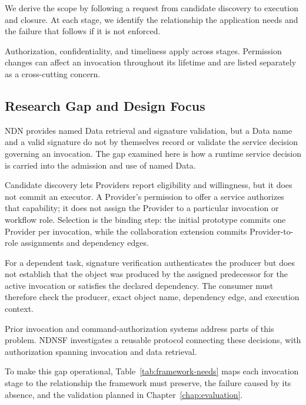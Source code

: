 We derive the scope by following a request from candidate discovery to execution and closure. At each stage, we identify the relationship the application needs and the failure that follows if it is not enforced.

Authorization, confidentiality, and timeliness apply across stages. Permission changes can affect an invocation throughout its lifetime and are listed separately as a cross-cutting concern.

\subsection{Research Gap and Design Focus}
NDN provides named Data retrieval and signature validation, but a Data name and a valid signature do not by themselves record or validate the service decision governing an invocation. The gap examined here is how a runtime service decision is carried into the admission and use of named Data.

Candidate discovery lets Providers report eligibility and willingness, but it does not commit an executor. A Provider's permission to offer a service authorizes that capability; it does not assign the Provider to a particular invocation or workflow role. Selection is the binding step: the initial prototype commits one Provider per invocation, while the collaboration extension commits Provider-to-role assignments and dependency edges.

For a dependent task, signature verification authenticates the producer but does not establish that the object was produced by the assigned predecessor for the active invocation or satisfies the declared dependency. The consumer must therefore check the producer, exact object name, dependency edge, and execution context.

Prior invocation and command-authorization systems address parts of this problem. NDNSF investigates a reusable protocol connecting these decisions, with authorization spanning invocation and data retrieval.

To make this gap operational, Table~\ref{tab:framework-needs} maps each invocation stage to the relationship the framework must preserve, the failure caused by its absence, and the validation planned in Chapter~\ref{chap:evaluation}.

